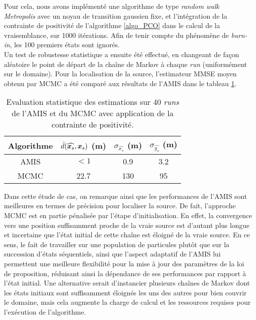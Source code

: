 {Pour cela, nous avons implémenté une algorithme de type \textit{random walk Metropolis}  avec un noyau de transition gaussien fixe, et l'intégration de la contrainte de positivité de l'algorithme \ref{algo_PCO} dans le calcul de la vraisemblance, sur 1000 itérations. Afin de tenir compte du phénomène de \textit{burn-in}, les 100 premiers états sont ignorés. \\

Un test de robustesse statistique a ensuite été effectué, en changeant de façon aléatoire le point de départ de la chaîne de Markov à chaque \textit{run} (uniformément sur le domaine). Pour la localisation de la source, l'estimateur MMSE moyen obtenu par MCMC a été comparé aux résultats de l'AMIS dans le tableau \ref{table_2_AE}. \\

    \begin{table}[h!]
    	\centering
    	
    	\begin{tabular}{cccc}
    		
    		Algorithme &{ $\bar{d}(\widehat{{\bm{x}_s}},{\bm{x}_s})$ (m)}& $\sigma_{\widehat{x_s}}$ (m)& $\sigma_{\widehat{y_s}}$ (m)\\
    		\hline
    		AMIS                   & {$<1$}  	& 0.9        & 3.2        \\
    		MCMC                   & {22.7}  & 130        & 95 \\      
    		\hline
    	\end{tabular}
    	\caption{Evaluation statistique des estimations sur 40 \textit{runs} de l'AMIS et du MCMC avec application de la contrainte de positivité.}
    	\label{table_2_AE}
    \end{table}
    
 Dans cette étude de cas, on remarque ainsi que les performances de l'AMIS sont meilleures en termes de précision pour localiser la source. De fait, l'approche MCMC est en partie pénalisée par l'étape d'initialisation. En effet, la convergence vers une position suffisamment proche de la vraie source est d'autant plus longue et incertaine que l'état initial de cette chaîne est éloigné de la vraie source. En ce sens, le fait de travailler sur une population de particules plutôt que sur la succession d'états séquentiels, ainsi que l'aspect adaptatif de l'AMIS lui permettent une meilleure flexibilité pour la mise à jour des paramètres de la loi de proposition, réduisant ainsi la dépendance de ses performances par rapport à l'état initial. Une alternative serait d'instancier plusieurs chaînes de Markov dont les états initiaux sont suffisamment éloignés les uns des autres pour bien couvrir le domaine, mais cela augmente la charge de calcul et les ressources requises pour l'exécution de l'algorithme. \\
 
}

